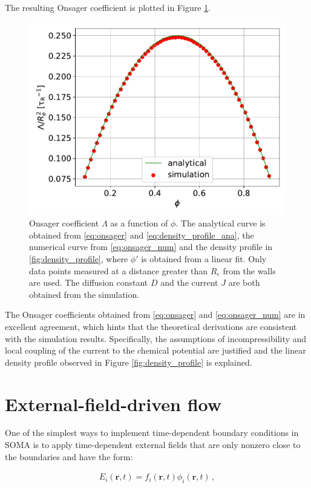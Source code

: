 \documentclass[bachelor,       %
               twoside,        %
               BCOR10mm,       %
               ngerman, english %
               ]{GAUBM}
\begin{document}
The resulting Onsager coefficient is plotted in Figure \ref{fig:onsager_coeff}.

\begin{figure}[h]
  \centering
  \includegraphics[width=0.6\linewidth]{figures/onsager_coll_diff.pdf}
  \caption{Onsager coefficient $\Lambda$ as a function of $\phi$. The analytical curve is obtained from \eqref{eq:onsager} and \eqref{eq:density_profile_ana}, the numerical curve from \eqref{eq:onsager_num} and the density profile in \ref{fig:density_profile}, where $\phi'$ is obtained from a linear fit. Only data points measured at a distance greater than $R_e$ from the walls are used. The diffusion constant $D$ and the current $J$ are both obtained from the simulation.}
  \label{fig:onsager_coeff}
\end{figure}

The Onsager coefficients obtained from \eqref{eq:onsager} and \eqref{eq:onsager_num} are in excellent agreement, which hints that the theoretical derivations are consistent with the simulation results. 
Specifically, the assumptions of incompressibility and local coupling of the current to the chemical potential are justified and the linear density profile observed in Figure \ref{fig:density_profile} is explained.


\chapter{External-field-driven flow}

One of the simplest ways to implement time-dependent boundary conditions in \ac{SOMA} is to apply time-dependent external fields that are only nonzero close to the boundaries and have the form:

\begin{align}
    E_i(\mathbf{r},t)=f_i(\mathbf r,t)\phi_i({\mathbf r,t})\,,
\end{align}
\end{document}
